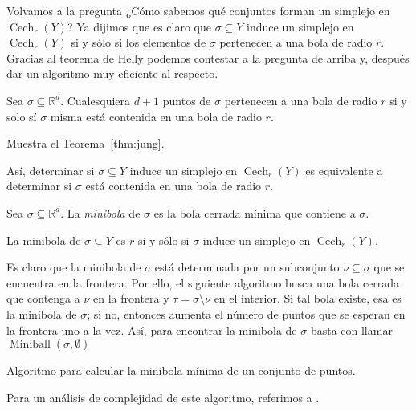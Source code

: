 \documentclass{standalone}
\begin{document}
	Volvamos a la pregunta ¿Cómo sabemos qué conjuntos forman un simplejo en $\operatorname{Cech}_{r}(Y)$? Ya dijimos que es claro que $\sigma\subseteq Y$ induce un simplejo en $\operatorname{Cech}_{r}(Y)$ si y sólo si los elementos de $\sigma$ pertenecen a una bola de radio $r$. Gracias al teorema de Helly podemos contestar a la pregunta de arriba y, después dar un algoritmo muy eficiente al respecto.
	
	\begin{theorem}\label{thm:jung}
		Sea $\sigma\subseteq\mathbb{R}^{d}$. Cualesquiera $d+1$ puntos de $\sigma$ pertenecen a una bola de radio $r$ si y solo sí $\sigma$ misma está contenida en una bola de radio $r$.
	\end{theorem}
	
	\begin{exercise}
		Muestra el Teorema~\ref{thm:jung}.
	\end{exercise}
	
	Así, determinar si $\sigma\subseteq Y$ induce un simplejo en $\operatorname{Cech}_{r}(Y)$ es equivalente a determinar si $\sigma$ está contenida en una bola de radio $r$.
	
	\begin{definition}\label{def:miniball}
		Sea $\sigma\subseteq\mathbb{R}^{d}$. La \emph{minibola} de $\sigma$ es la bola cerrada mínima que contiene a $\sigma$.
	\end{definition}
	
	\begin{exercise}
		La minibola de $\sigma\subseteq Y$ es $r$ si y sólo si $\sigma$ induce un simplejo en $\operatorname{Cech}_{r}(Y)$.
	\end{exercise}
	
	Es claro que la minibola de $\sigma$ está determinada por un subconjunto $\nu\subseteq\sigma$ que se encuentra en la frontera. Por ello, el siguiente algoritmo busca una bola cerrada que contenga a $\nu$ en la frontera y $\tau=\sigma\setminus\nu$ en el interior. Si tal bola existe, esa es la minibola de $\sigma$; si no, entonces aumenta el número de puntos que se esperan en la frontera uno a la vez. Así, para encontrar la minibola de $\sigma$ basta con llamar $\operatorname{Miniball}(\sigma, \emptyset)$
	
	\begin{algorithm}
		\DontPrintSemicolon
		\caption{Algoritmo para calcular la minibola mínima de un conjunto de puntos.}
	\end{algorithm}
	
	Para un análisis de complejidad de este algoritmo, referimos a \cite{edelsbrunner:2010:computational}.
	
	
	
\end{document}
